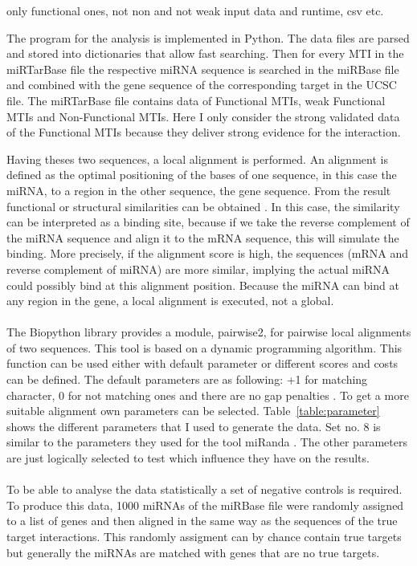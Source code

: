 \documentclass[12pt]{article}
\begin{document}
only functional ones, not non and not weak
input data and runtime, csv etc.

The program for the analysis is implemented in Python. The data files are parsed and stored into dictionaries that allow fast searching. Then for every MTI in the miRTarBase file the respective miRNA sequence is searched in the miRBase file and combined with the gene sequence of the corresponding target in the UCSC file. The miRTarBase file contains data of Functional MTIs, weak Functional MTIs and Non-Functional MTIs. Here I only consider the strong validated data of the Functional MTIs because they deliver strong evidence for the interaction. 

Having theses two sequences, a local alignment is performed. An alignment is defined as the optimal positioning of the bases of one sequence, in this case the miRNA, to a region in the other sequence, the gene sequence. From the result functional or structural similarities can be obtained \cite{alignment}. In this case, the similarity can be interpreted as a binding site, because if we take the reverse complement of the miRNA sequence and align it to the mRNA sequence, this will simulate the binding. More precisely, if the alignment score is high, the sequences (mRNA and reverse complement of miRNA) are more similar, implying the actual miRNA could possibly bind at this alignment position. Because the miRNA can bind at any region in the gene, a local alignment is executed, not a global.\\\\

The Biopython library provides a module, pairwise2, for pairwise local alignments of two sequences. This tool is based on a dynamic programming algorithm. This function can be used either with default parameter or different scores and costs can be defined. The default parameters are as following: +1 for matching character, 0 for not matching ones and there are no gap penalties \cite{pairwise}. To get a more suitable alignment own parameters can be selected. Table~\ref{table:parameter} shows the different parameters that I used to generate the data. Set no. 8 is similar to the parameters they used for the tool miRanda \cite{Enright}. The other parameters are just logically selected to test which influence they have on the results. \\\\

To be able to analyse the data statistically a set of negative controls is required. To produce this data, 1000 miRNAs of the miRBase file were randomly assigned to a list of genes and then aligned in the same way as the sequences of the true target interactions. This randomly assigment can by chance contain true targets but generally the miRNAs are matched with genes that are no true targets. \\\\
\end{document}
